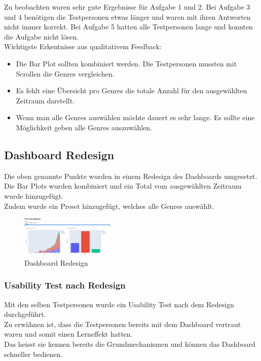 \documentclass{article}
\begin{document}
\noindent
Zu beobachten waren sehr gute Ergebnisse für Aufgabe 1 und 2. Bei Aufgabe 3 und 4 benötigen die Testpersonen etwas länger und waren mit ihren Antworten nicht immer korrekt.
Bei Aufgabe 5 hatten alle Testpersonen lange und konnten die Aufgabe nicht lösen.\\
\noindent
Wichtigste Erkentnisse aus qualitativem Feedback:
\begin{itemize}
    \item Die Bar Plot sollten kombiniert werden. Die Testpersonen mussten mit Scrollen die Genres vergleichen.
    \item Es fehlt eine Übersicht pro Genres die totale Anzahl für den ausgewählten Zeitraum darstellt.
    \item Wenn man alle Genres auswählen möchte dauert es sehr lange. Es sollte eine Möglichkeit geben alle Genres auszuwählen.
\end{itemize}
\newpage

\subsection{Dashboard Redesign}

Die oben genannte Punkte wurden in einem Redesign des Dashboards umgesetzt.\\
Die Bar Plots wurden kombiniert und ein Total vom ausgewählten Zeitraum wurde hinzugefügt.\\
Zudem wurde ein Preset hinzugefügt, welches alle Genres auswählt.\\

\begin{figure}[!h]
\centering
\includegraphics[width=0.4\textwidth]{img/dashboard_redesign.png}
\caption{\label{fig: LE4 Dashboard Redesign} Dashboard Redesign}
\end{figure}

\subsubsection{Usability Test nach Redesign}
Mit den selben Testpersonen wurde ein Usability Test nach dem Redesign durchgeführt.\\
Zu erwähnen ist, dass die Testpersonen bereits mit dem Dashboard vertraut waren und somit einen Lerneffekt hatten.\\
Das heisst sie kennen bereits die Grundmechanismen und können das Dashboard schneller bedienen.\\
\end{document}
